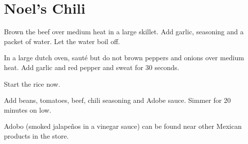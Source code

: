 

\section{Noel's Chili}
\begin{recipe}



Brown the beef over medium heat in a large skillet. Add garlic, seasoning and a packet of water.  Let the water boil off.


In a large dutch oven, sauté but do not brown peppers and onions over medium heat. Add garlic and red pepper and sweat for 30 seconds.

\columnbreak


Start the rice now.


Add beans, tomatoes, beef, chili seasoning and Adobe sauce. Simmer for 20 minutes on low.

Adobo (smoked jalapeños in a vinegar sauce) can be found near other Mexican products in the store.



\end{recipe}
